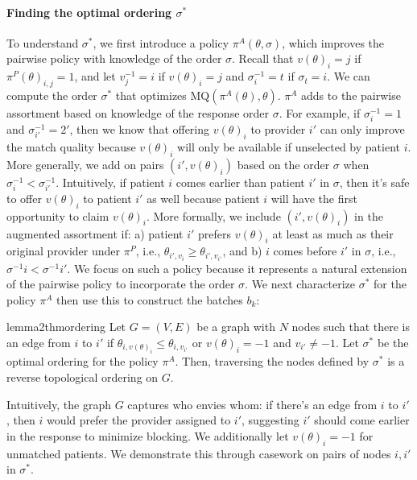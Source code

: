 \documentclass[11pt]{article}
\begin{document}
\paragraph{Finding the optimal ordering $\sigma^{*}$} 
To understand $\sigma^{*}$, we first introduce a policy $\pi^{A}(\theta,\sigma)$, which improves the pairwise policy with knowledge of the order $\sigma$. 
Recall that $v(\theta)_{i} = j$ if $\pi^{P}(\theta)_{i,j} = 1$, and let $v^{-1}_{j} = i$ if $v(\theta)_{i}=j$ and $\sigma^{-1}_{i} = t$ if $\sigma_{t} = i$. 
We can compute the order $\sigma^{*}$ that optimizes $\mathrm{MQ}(\pi^{A}(\theta),\theta)$.
$\pi^{A}$ adds to the pairwise assortment based on knowledge of the response order $\sigma$. 
For example, if $\sigma^{-1}_{i} = 1$ and $\sigma^{-1}_{i'} = 2'$, then we know that offering $v(\theta)_{i}$ to provider $i'$ can only improve the match quality because $v(\theta)_{i}$ will only be available if unselected by patient $i$. 
More generally, we add on pairs $(i',v(\theta)_{i})$ based on the order $\sigma$ when $\sigma^{-1}_{i} < \sigma^{-1}_{i'}$. 
Intuitively, if patient $i$ comes earlier than patient $i'$ in $\sigma$, then it's safe to offer $v(\theta)_{i}$ to patient $i'$ as well because patient $i$ will have the first opportunity to claim $v(\theta)_{i}$.
More formally, we include $(i',v(\theta)_{i})$ in the augmented assortment if: a) patient $i'$ prefers $v(\theta)_{i}$ at least as much as their original provider under $\pi^P$, i.e., $\theta_{i', v_i} \geq \theta_{i', v_{i'}}$, and b) $i$ comes before $i'$ in $\sigma$, i.e., $\sigma^{-1}i < \sigma^{-1}{i'}$.
We focus on such a policy because it represents a natural extension of the pairwise policy to incorporate the order $\sigma$. 
We next characterize $\sigma^{*}$ for the policy $\pi^{A}$ then use this to construct the batches $b_{k}$: 
\begin{restatable}{lemma2}{thmordering} 
    Let $G=(V,E)$ be a graph with $N$ nodes such that there is an edge from $i$ to $i'$ if $\theta_{i,v(\theta)_{i}} \leq \theta_{i,v_{i'}}$ or $v(\theta)_{i} = -1$ and $v_{i'} \neq -1$. 
    Let $\sigma^{*}$ be the optimal ordering for the policy $\pi^{A}$.
    Then, traversing the nodes defined by $\sigma^{*}$ is a reverse topological ordering on $G$. 
\end{restatable}
Intuitively, the graph $G$ captures who envies whom: if there's an edge from $i$ to $i'$, then $i$ would prefer the provider assigned to $i'$, suggesting $i'$ should come earlier in the response to minimize blocking.
We additionally let $v(\theta)_{i} = -1$ for unmatched patients. 
We demonstrate this through casework on pairs of nodes $i,i'$ in $\sigma^{*}$. 
\end{document}
